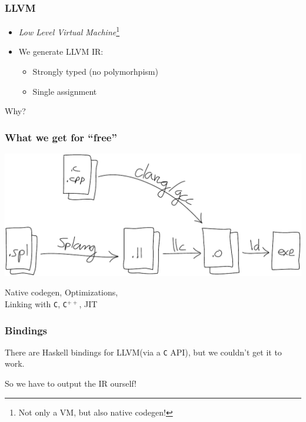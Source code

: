 \documentclass[14pt]{beamer}
\title{\splang}
\author{Wouter Geraedts \and Joshua Moerman}
\institute{Radboud Universiteit Nijmegen}
\date{}
\newcommand{\llvm}{\textsc{LLVM}\xspace}
\newcommand{\C}{\texttt{C}\xspace}
\newcommand{\Cpp}{\texttt{C}$^{++}$\xspace}
\begin{document}
\begin{frame}
	\titlepage
\end{frame}

\begin{frame}
	\frametitle{\llvm}

	\begin{itemize}
		\item \emph{Low Level Virtual Machine}\footnote{Not only a VM, but also native codegen!}
		\item We generate \llvm IR:
		\begin{itemize}
			\item Strongly typed (no polymorhpism)
			\item Single assignment
		\end{itemize}
	\end{itemize}

	\bigskip
	\pause
	\begin{center}
		Why?
	\end{center}
\end{frame}

\begin{frame}
\begin{center}
	\frametitle{What we get for ``free''}
	\includegraphics[width=\textwidth]{linking}
	\bigskip

	Native codegen, \quad Optimizations,\\
	Linking with \C, \Cpp, \quad JIT
\end{center}
\end{frame}

\begin{frame}
	\frametitle{Bindings}
	There are Haskell bindings for \llvm (via a \C API), but we couldn't get it to work.

	\bigskip
	So we have to output the IR ourself!
\end{frame}
\end{document}
